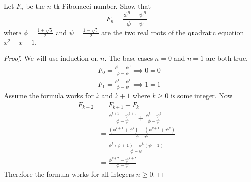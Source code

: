 \documentclass[11pt,numbers=noenddot,svgnames,dvipsnames]{scrartcl}
\begin{document}
\begin{example}
    Let $F_{n}$ be the $n$-th Fibonacci number. Show that 
    \[
        F_{n} = \frac{\phi^{n} - \psi^{n}}{\phi - \psi}
    \]
    where $\phi = \frac{1 + \sqrt{5}}{2}$ and $\psi = \frac{1 - \sqrt{5}}{2}$ are the two real roots 
    of the quadratic equation $x^{2} - x - 1$.
\end{example}
\begin{proof}
    We will use induction on $n$. The base cases $n = 0$ and $n = 1$ are both true.
    \begin{align*}
        & F_{0} = \frac{\phi^{0} - \psi^{0}}{\phi - \psi} \implies 0 = 0 \\
        & F_{1} = \frac{\phi^{1} - \psi^{1}}{\phi - \psi} \implies 1 = 1
    \end{align*}
    Assume the formula works for $k$ and $k + 1$ where $k \geq 0$ is some integer. Now 
    \begin{align*}
        F_{k + 2} & = F_{k + 1} + F_{k} \\
                  & = \frac{\phi^{k + 1} - \psi^{k + 1}}{\phi - \psi} + \frac{\phi^{k} - \psi^{k}}{\phi - \psi} \\
                  & = \frac{\left(\phi^{k + 1} + \phi^{k}\right) - \left(\psi^{k + 1} + \psi^{k}\right)}{\phi - \psi} \\
                  & = \frac{\phi^{k}\left(\phi + 1\right) - \psi^{k}(\psi + 1)}{\phi - \psi} \\
                  & = \frac{\phi^{k + 2} - \psi^{k + 2}}{\phi - \psi}
    \end{align*}
    Therefore the formula works for all integers $n \geq 0$.
\end{proof}
\end{document}
